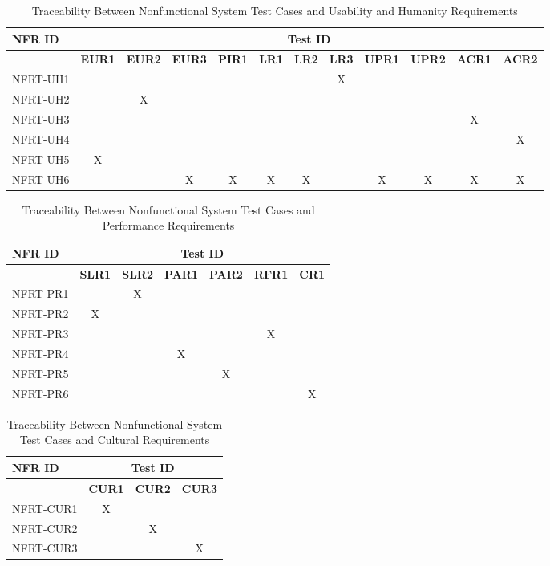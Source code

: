 \documentclass[12pt, titlepage]{article}
\begin{document}
\begin{landscape}
  \begin{longtable}{|l|ccccccccccc|}
		\caption{Traceability Between Nonfunctional System Test Cases and Usability and Humanity Requirements} \\
		\hline
    \textbf{NFR ID}   & \multicolumn{11}{c|}{\textbf{Test ID}} \\
    \hline
    ~ & \textbf{EUR1} & \textbf{EUR2} & \textbf{EUR3} & \textbf{PIR1} & \textbf{LR1} & \sout{\textbf{LR2}} & \textbf{LR3} & \textbf{UPR1} & \textbf{UPR2} & \textbf{ACR1} & \sout{\textbf{ACR2}} \\
    \hline
    NFRT-UH1 & ~ & ~ & ~ & ~ & ~ & ~ & X & ~ & ~ & ~ & ~ \\
    NFRT-UH2 & ~ & X & ~ & ~ & ~ & ~ & ~ & ~ & ~ & ~ & ~ \\
    NFRT-UH3 & ~ & ~ & ~ & ~ & ~ & ~ & ~ & ~ & ~ & X & ~ \\
    NFRT-UH4 & ~ & ~ & ~ & ~ & ~ & ~ & ~ & ~ & ~ & ~ & X \\
    NFRT-UH5 & X & ~ & ~ & ~ & ~ & ~ & ~ & ~ & ~ & ~ & ~ \\
    NFRT-UH6 & ~ & ~ & X & X & X & X & ~ & X & X & X & X \\
    \hline
  \end{longtable}

  \newpage

  \begin{longtable}{|l|cccccc|}
		\caption{Traceability Between Nonfunctional System Test Cases and Performance Requirements} \\
		\hline
    \textbf{NFR ID}   & \multicolumn{6}{c|}{\textbf{Test ID}} \\
    \hline
    ~ & \textbf{SLR1} & \textbf{SLR2} & \textbf{PAR1} & \textbf{PAR2} & \textbf{RFR1} & \textbf{CR1} \\
    \hline
    NFRT-PR1 & ~ & X & ~ & ~ & ~ & ~ \\
    NFRT-PR2 & X & ~ & ~ & ~ & ~ & ~ \\
    NFRT-PR3 & ~ & ~ & ~ & ~ & X & ~ \\
    NFRT-PR4 & ~ & ~ & X & ~ & ~ & ~ \\
    NFRT-PR5 & ~ & ~ & ~ & X & ~ & ~ \\
    NFRT-PR6 & ~ & ~ & ~ & ~ & ~ & X \\
    \hline
  \end{longtable}

  \begin{longtable}{|l|ccc|}
		\caption{Traceability Between Nonfunctional System Test Cases and Cultural Requirements} \\
		\hline
    \textbf{NFR ID}   & \multicolumn{3}{c|}{\textbf{Test ID}} \\
    \hline
    ~ & \textbf{CUR1} & \textbf{CUR2} & \textbf{CUR3} \\
    \hline
    NFRT-CUR1 & X & ~ & ~ \\
    NFRT-CUR2 & ~ & X & ~ \\
    NFRT-CUR3 & ~ & ~ & X \\
    \hline
  \end{longtable}


\end{landscape}
\end{document}
